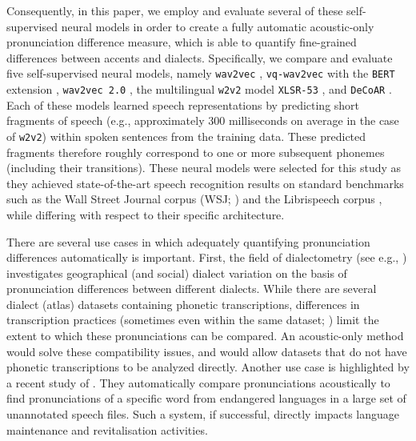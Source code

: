 \documentclass[11pt,a4paper]{article}
\begin{document}
Consequently, in this paper, we employ and evaluate several of these self-supervised neural models in order to create a fully automatic acoustic-only pronunciation difference measure, which is able to quantify fine-grained differences between accents and dialects. Specifically, we compare and evaluate five self-supervised neural models, namely \texttt{wav2vec} \citep[subsequently denoted by \texttt{w2v}]{schneider2019wav2vec}, \texttt{vq-wav2vec} with the \texttt{BERT} extension \citep[subsequently denoted by \texttt{vqw2v}]{baevski2019vq}, \texttt{wav2vec~2.0} \citep[subsequently denoted by \texttt{w2v2}]{baevski2020wav2vec}, the multilingual \texttt{w2v2} model \texttt{XLSR-53} \citep[subsequently denoted by \texttt{XLSR}]{conneau2020unsupervised}, and \texttt{DeCoAR} \citep{ling2020deep}.
Each of these models learned speech representations by predicting short fragments of speech (e.g., approximately 300 milliseconds on average in the case of \texttt{w2v2}) within spoken sentences from the training data. These predicted fragments therefore roughly correspond to one or more subsequent phonemes (including their transitions).
These neural models were selected for this study as they achieved state-of-the-art speech recognition results on standard benchmarks such as the Wall Street Journal corpus (WSJ; \citealp{garofalo2007csr}) and the Librispeech corpus \citep{panayotov_librispeech_2015}, while differing with respect to their specific architecture.

There are several use cases in which adequately quantifying pronunciation differences automatically is important. First, the field of dialectometry (see e.g., \citealp{nerbonne1997measuring,wieling2011,wieling2015}) investigates geographical (and social) dialect variation on the basis of pronunciation differences between different dialects. While there are several dialect (atlas) datasets containing phonetic transcriptions, differences in transcription practices (sometimes even within the same dataset; \citealp{wieling2007aggregate}) limit the extent to which these pronunciations can be compared. An acoustic-only method would solve these compatibility issues, and would allow datasets that do not have phonetic transcriptions to be analyzed directly. Another use case is highlighted by a recent study of \citet{san2021leveraging}. They automatically compare pronunciations acoustically to find pronunciations of a specific word from endangered languages in a large set of unannotated speech files. Such a system, if successful, directly impacts language maintenance and revitalisation activities.
\end{document}
